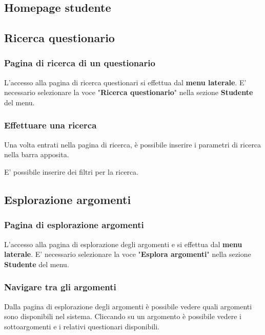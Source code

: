 \documentclass[12pt,a4paper]{article}
\begin{document}
	\subsection{Homepage studente}
	\subsection{Ricerca questionario}\label{ricerca_questionario}
	\subsubsection{Pagina di ricerca  di un questionario}
	L'accesso alla pagina di ricerca questionari si effettua dal \textbf{menu laterale}. 
	E' necessario selezionare la voce "\textbf{Ricerca questionario}" nella sezione \textbf{Studente} del menu.
	\subsubsection{Effettuare una ricerca}
	Una volta entrati nella pagina di ricerca, è possibile inserire i parametri di ricerca nella barra apposita.
	\begin{comment}
	inserire immagine barra di ricerca
	\end{comment}
	
	E' possibile inserire dei filtri per la ricerca. 
	\begin{comment} inserire immagine e altre informazioni per la ricerca con filtri	\end{comment}
	\subsection{Esplorazione argomenti}
	
	\subsubsection{Pagina di esplorazione argomenti} \label{esplorazione_arg}
	L'accesso alla pagina di esplorazione degli argomenti e si effettua dal \textbf{menu laterale}. 
	E' necessario selezionare la voce "\textbf{Esplora argomenti}" nella sezione \textbf{Studente} del menu.
	\subsubsection{Navigare tra gli argomenti}
	Dalla pagina di esplorazione degli argomenti è possibile vedere quali argomenti sono disponibili nel sistema. Cliccando su un argomento è possibile vedere i sottoargomenti e i relativi questionari disponibili.
	
\end{document}
